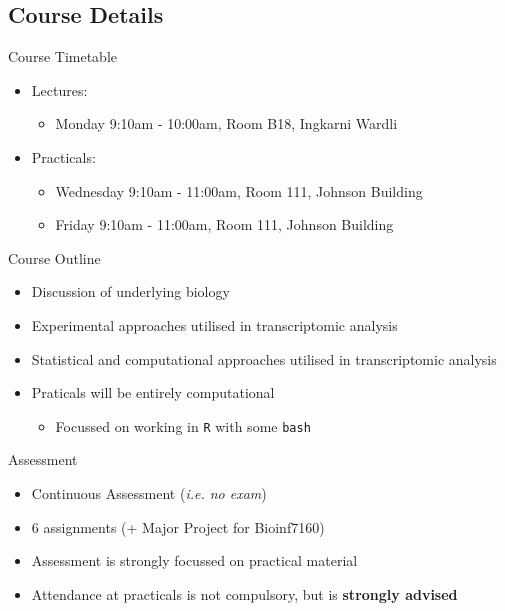 \documentclass[11pt]{beamer}
\begin{document}
\subsection{Course Details}

\linespread{1.2}

\begin{frame}{Course Timetable}

	\begin{itemize}
		\item Lectures:
		\begin{itemize}
			\item Monday 9:10am - 10:00am, Room B18, Ingkarni Wardli
\end{itemize}		 
		\item Practicals:
		\begin{itemize}
			\item Wednesday 9:10am - 11:00am, Room 111, Johnson Building
			\item Friday 9:10am - 11:00am, Room 111, Johnson Building
		\end{itemize}
	\end{itemize}

\end{frame}

\begin{frame}{Course Outline}

	\begin{itemize}
		\item Discussion of underlying biology
		\item Experimental approaches utilised in transcriptomic analysis
		\item Statistical and computational approaches utilised in transcriptomic analysis
		\item Praticals will be entirely computational
		\begin{itemize}
			\item Focussed on working in \texttt{R} with some \texttt{bash}
		\end{itemize}
	\end{itemize}

\end{frame}

\begin{frame}{Assessment}

	\begin{itemize}
		\item Continuous Assessment (\textit{i.e. no exam})
		\item 6 assignments (+ Major Project for Bioinf7160)
		\item Assessment is strongly focussed on practical material
		\item Attendance at practicals is not compulsory, but is \textbf{strongly advised}
	\end{itemize}

\end{frame}
\end{document}
